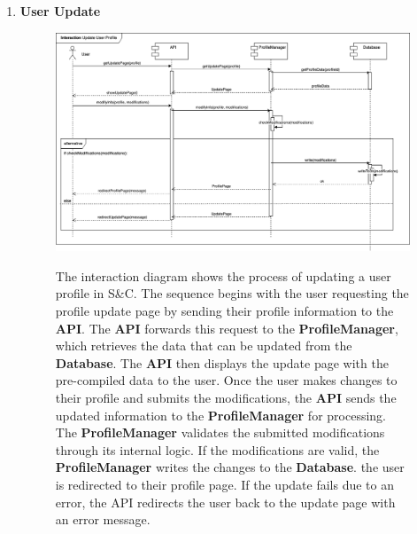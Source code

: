 \begin{enumerate}
    \newpage
    \item \textbf{User Update}
    \begin{figure}[h!]
            \centering  \includegraphics[width=1\textwidth]{DD/Images/Interactions/INT03_UserUpdate.drawio.png}
            \label{fig:ComponentViewDiagram}
            \caption*{The interaction diagram shows the process of updating a user profile in S\&C. The sequence begins with the user requesting the profile update page by sending their profile information to the \textbf{API}. The \textbf{API} forwards this request to the \textbf{ProfileManager}, which retrieves the data that can be updated  from the \textbf{Database}. The \textbf{API} then displays the update page with the pre-compiled data to the user.
            Once the user makes changes to their profile and submits the modifications, the \textbf{API} sends the updated information to the \textbf{ProfileManager} for processing. The \textbf{ProfileManager} validates the submitted modifications through its internal logic. If the modifications are valid, the \textbf{ProfileManager} writes the changes to the \textbf{Database}.
            the user is redirected to their profile page. If the update fails due to an error, the API redirects the user back to the update page with an error message.}
    \end{figure}


\end{enumerate}

